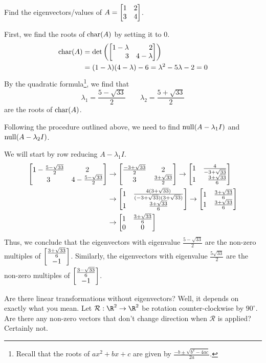 \begin{example}
	Find the eigenvectors/values of $A=\mat{1&2\\3&4}$.

	First, we find the roots of $\operatorname{char}(A)$ by setting it to $0$.
	\begin{align*}
	    \Char(A)&=\det\left(\mat{1-\lambda&2\\3&4-\lambda}\right)\\
	            &=(1-\lambda)(4-\lambda)-6=\lambda^2-5\lambda-2=0
	\end{align*}
	By the quadratic formula\footnote{ Recall that the
	roots of $ax^2+bx+c$ are given by $\frac{-b\pm\sqrt{b^2-4ac}}{2a}$.}, we find that
	\[\lambda_1=\frac{5-\sqrt{33}}{2}\qquad\lambda_2=\frac{5+\sqrt{33}}{2}\]
	are the roots of $\operatorname{char}(A)$.
	
	
	Following the procedure outlined above, we need to
	find $\operatorname{null}(A-\lambda_1I)$ and $\operatorname{null}(A-\lambda_2I)$.
	
	We will start by row reducing $A-\lambda_1I$.
	\begin{align*}
	    \matc{1-\frac{5-\sqrt{33}}{2}&2\\3&4-\frac{5-\sqrt{33}}{2}} & \to
	    \matc{\frac{-3+\sqrt{33}}{2}&2\\3&\frac{3+\sqrt{33}}{2}} \to \mat{1&\frac{4}{-3+\sqrt{33}}\\1&\frac{3+\sqrt{33}}{6}}\\
	    & \to \matc{1&\frac{4(3+\sqrt{33})}{(-3+\sqrt{33})(3+\sqrt{33})}\\1&\frac{3+\sqrt{33}}{6}} \to \mat{1&\frac{3+\sqrt{33}}{6}\\1&\frac{3+\sqrt{33}}{6}}\\
	    & \to \matc{1&\frac{3+\sqrt{33}}{6}\\0&0}
	\end{align*}
	Thus, we conclude that the eigenvectors with eigenvalue $\frac{5-\sqrt{33}}{2}$ are the non-zero multiples of 
	$\begin{bmatrix}\frac{3+\sqrt{33}}{6}\\-1\end{bmatrix}$. 
	Similarly, the eigenvectors with eigenvalue $\frac{5\sqrt{33}}{2}$ 
	are the non-zero multiples of $\begin{bmatrix}\frac{3-\sqrt{33}}{6}\\-1\end{bmatrix}$.
\end{example}


Are there linear transformations without eigenvectors? Well, it
depends on exactly what you mean. Let $\mathcal R:\R^2\to\R^2$
be rotation counter-clockwise by $90^\circ$. Are there any non-zero
vectors that don't change direction when $\mathcal R$ is applied?
Certainly not.

